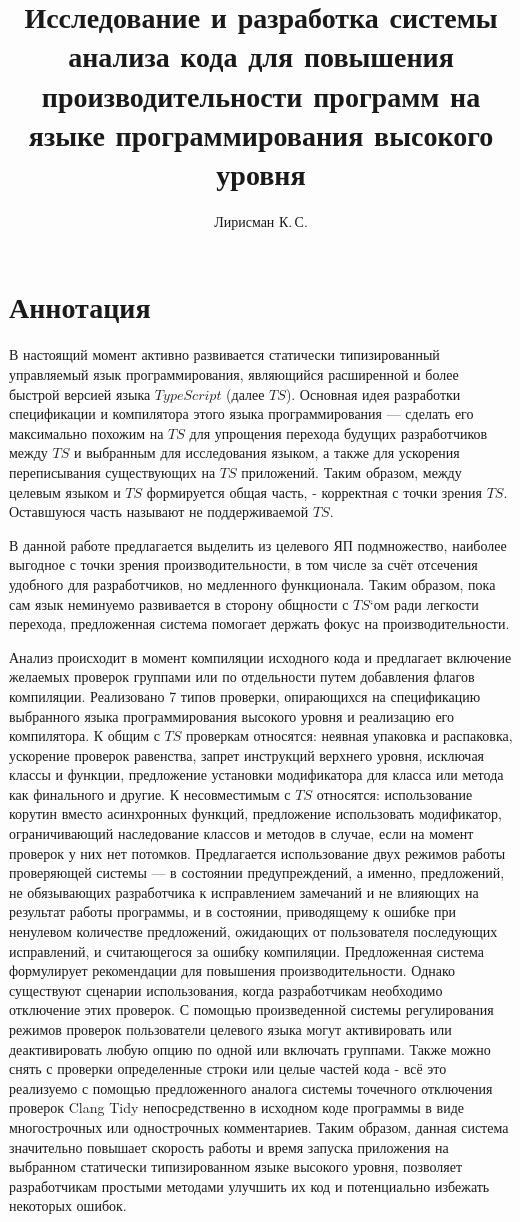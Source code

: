 \documentclass{mipt-thesis-bs}
\title{Исследование и разработка системы анализа кода для повышения производительности программ на языке программирования высокого уровня}
\author{Лирисман К.\,С.}
\begin{document}
\titlecontents
\chapter{Аннотация}

В настоящий момент активно развивается статически типизированный управляемый язык
программирования, являющийся расширенной и более быстрой версией языка $TypeScript$ (далее $TS$).
Основная идея разработки спецификации и компилятора этого языка программирования — сделать его максимально
похожим на $TS$ для упрощения перехода будущих разработчиков между $TS$ и
выбранным для исследования языком, а также для ускорения переписывания существующих на $TS$ приложений.
Таким образом, между целевым языком и $TS$ формируется общая часть, - корректная с точки зрения $TS$.
Оставшуюся часть называют не поддерживаемой $TS$.

В данной работе предлагается выделить из целевого ЯП подмножество, наиболее выгодное с точки зрения производительности,
в том числе за счёт отсечения удобного для разработчиков, но медленного функционала. Таким образом, пока сам язык неминуемо
развивается в сторону общности с $TS$`ом ради легкости перехода, предложенная система помогает держать фокус
на производительности.

Анализ происходит в момент компиляции исходного кода и предлагает включение желаемых
проверок группами или по отдельности путем добавления флагов компиляции. Реализовано
7 типов проверки, опирающихся на спецификацию выбранного языка
программирования высокого уровня и реализацию его компилятора. К общим с $TS$ проверкам относятся:
неявная упаковка и распаковка, ускорение проверок равенства, запрет инструкций верхнего уровня, исключая
классы и функции, предложение установки модификатора для класса или метода как
финального и другие. К несовместимым с $TS$ относятся: использование корутин вместо асинхронных функций,
предложение использовать модификатор, ограничивающий наследование классов и методов в случае, если на
момент проверок у них нет потомков.
Предлагается использование двух режимов работы проверяющей системы — в состоянии
предупреждений, а именно, предложений, не обязывающих разработчика к исправлением замечаний и не
влияющих на результат работы программы, и в состоянии, приводящему к ошибке при ненулевом количестве
предложений, ожидающих от пользователя последующих исправлений, и считающегося за
ошибку компиляции.
Предложенная система формулирует рекомендации для повышения производительности. Однако
существуют сценарии использования, когда разработчикам необходимо отключение этих проверок.
С помощью произведенной системы регулирования режимов проверок пользователи целевого языка
могут активировать или деактивировать любую опцию по одной или включать группами.
Также можно снять с проверки определенные строки или целые частей кода - всё это реализуемо с помощью
предложенного аналога системы точечного отключения проверок Clang Tidy непосредственно
в исходном коде программы в виде многострочных или однострочных комментариев.
Таким образом, данная система значительно повышает скорость работы и время запуска
приложения на выбранном статически типизированном языке высокого уровня, позволяет разработчикам
простыми методами улучшить их код и потенциально избежать некоторых ошибок.
\end{document}
